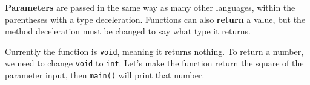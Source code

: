 		\textbf{Parameters} are passed in the same way as many other languages, within the parentheses with a type deceleration. Functions can also \textbf{return} a value, but the method deceleration must be changed to say what type it returns.
		
		Currently the function is \texttt{void}, meaning it returns nothing. To return a number, we need to change \texttt{void} to \texttt{int}. Let's make the function return the square of the parameter input, then \texttt{main()} will print that number.
		
		
	
	